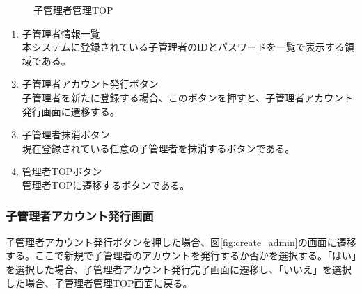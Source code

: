 \documentclass[a4j]{jarticle}
\begin{document}
\begin{figure}[H]
\centering
{}
\caption{子管理者管理TOP}
\label{fig:admin_child_top}
\end{figure}
\begin{enumerate}
  \renewcommand{\labelenumi}{\textcircled{\scriptsize \theenumi}}
  \item 子管理者情報一覧\\
  本システムに登録されている子管理者のIDとパスワードを一覧で表示する領域である。
  \item 子管理者アカウント発行ボタン\\
  子管理者を新たに登録する場合、このボタンを押すと、子管理者アカウント発行画面に遷移する。
  \item 子管理者抹消ボタン\\
  現在登録されている任意の子管理者を抹消するボタンである。
  \item 管理者TOPボタン\\
  管理者TOPに遷移するボタンである。
\end{enumerate}

\subsubsection{子管理者アカウント発行画面}
子管理者アカウント発行ボタンを押した場合、図\ref{fig:create_admin}の画面に遷移する。ここで新規で子管理者のアカウントを発行するか否かを選択する。「はい」を選択した場合、子管理者アカウント発行完了画面に遷移し、「いいえ」を選択した場合、子管理者管理TOP画面に戻る。
\end{document}
